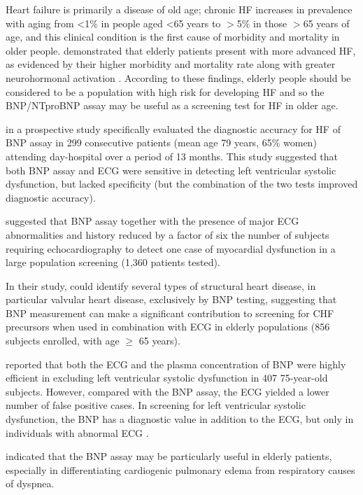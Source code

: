 \documentclass[14pt,a4paper,onecolumn]{extarticle}
\begin{document}
Heart failure is primarily a disease of old age; chronic HF increases in prevalence with aging from <1\% in people aged <65 years to $>$5\% in those $>$65 years of age, and this clinical condition is the first cause of morbidity and mortality in older people. \citep{bib3193} demonstrated that elderly patients present with more advanced HF, as evidenced by their higher morbidity and mortality rate along with greater neurohormonal activation . According to these findings, elderly people should be considered to be a population with high risk for developing HF and so the BNP/NTproBNP assay may be useful as a screening test for HF in older age.

\citep{bib3143} in a prospective study specifically evaluated the diagnostic accuracy for HF of BNP assay in 299 consecutive patients (mean age 79 years, 65\% women) attending day-hospital over a period of 13 months. This study suggested that both BNP assay and ECG were sensitive in detecting left ventricular systolic dysfunction, but lacked specificity (but the combination of the two tests improved diagnostic accuracy).

\citep{bib3171} suggested that BNP assay together with the presence of major ECG abnormalities and history reduced by a factor of six the number of subjects requiring echocardiography to detect one case of myocardial dysfunction in a large population screening (1,360 patients tested).

In their study, \citep{bib3174} could identify several types of structural heart disease, in particular valvular heart disease, exclusively by BNP testing, suggesting that BNP measurement can make a significant contribution to screening for CHF precursors when used in combination with ECG in elderly populations (856 subjects enrolled, with age $\geq$ 65 years).

\citep{bib3172} reported that both the ECG and the plasma concentration of BNP were highly efficient in excluding left ventricular systolic dysfunction in 407 75-year-old subjects. However, compared with the BNP assay, the ECG yielded a lower number of false positive cases. In screening for left ventricular systolic dysfunction, the BNP has a diagnostic value in addition to the ECG, but only in individuals with abnormal ECG \citep{bib3172}.

\citep{bib3146} indicated that the BNP assay may be particularly useful in elderly patients, especially in differentiating cardiogenic pulmonary edema from respiratory causes of dyspnea.
\end{document}
